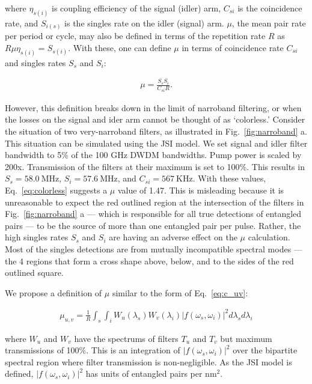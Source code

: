 \documentclass[11pt]{caltech_thesis} %
\begin{document}
where $\eta_{s(i)}$ is coupling efficiency of the signal (idler) arm, $C_{s i}$ is the coincidence rate, and $S_{i(s)}$ is the singles rate on the idler (signal) arm. $\mu$, the mean pair rate per period or cycle, may also be defined in terms of the repetition rate $R$ as $R \mu \eta_{s(i)}=S_{s(i)}$. With these, one can define $\mu$ in terms of coincidence rate $C_{s i}$ and singles rates $S_s$ and $S_i$:

\hypertarget{eq:colorless}{}{
\begin{align}
    \mu=\frac{S_s S_i}{C_{s i} R}. \label{eq:colorless}
\end{align}
}

However, this definition breaks down in the limit of narroband filtering, or when the losses on the signal and ider arm cannot be thought of as `colorless.' Consider the situation of two very-narroband filters, as illustrated in Fig.~\ref{fig:narroband} a. This situation can be simulated using the JSI model. We set signal and idler filter bandwidth to 5\% of the 100 GHz DWDM bandwidths. Pump power is scaled by 200x. Transmission of the filters at their maximum is set to 100\%. This results in $S_s = 58.0~\mathrm{MHz}$, $S_i = 57.6~\mathrm{MHz}$, and $C_{s i} = 567~\mathrm{KHz}$. With these values, Eq.~\ref{eq:colorless} suggests a $\mu$ value of 1.47. This is misleading because it is unreasonable to expect the red outlined region at the intersection of the filters in Fig.~\ref{fig:narroband} a --- which is responsible for all true detections of entangled pairs --- to be the source of more than one entangled pair per pulse. Rather, the high singles rates $S_s$ and $S_i$ are having an adverse effect on the $\mu$ calculation. Most of the singles detections are from mutually incompatible spectral modes --- the 4 regions that form a cross shape above, below, and to the sides of the red outlined square.

We propose a definition of $\mu$ similar to the form of Eq.~\ref{eq:c_uv}:

\hypertarget{eq:newmu}{}{
\begin{align}
    \mu_{u,v} = \frac{1}{R}\int_{s}\int_{i}W_u(\lambda_s)W_v(\lambda_i)|f(\omega_s, \omega_i)|^2 d\lambda_s d\lambda_i \label{eq:newmu}
\end{align}
}

where $W_u$ and $W_v$ have the spectrums of filters $T_u$ and $T_v$ but maximum transmissions of 100\%. This is an integration of $|f(\omega_s, \omega_i)|^2$ over the bipartite spectral region where filter transmission is non-negligible. As the JSI model is defined, $|f(\omega_s, \omega_i)|^2$ has units of entangled pairs per $\mathrm{nm}^2$.
\end{document}
